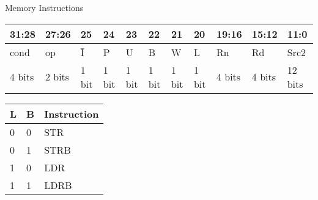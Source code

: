 \documentclass[aspectratio=169]{beamer}
\begin{document}
    \begin{frame}{Memory Instructions}
        \begin{center}
            \renewcommand{\arraystretch}{1.2}
            \begin{tabular}{|p{3.0em}|p{3.0em}|p{1.5em}|p{1.5em}|p{1.5em}|p{1.5em}|p{1.5em}|p{1.5em}|p{3.0em}|p{3.0em}|p{3.0em}|}
            \hline
            31:28 & 27:26 & 25 & 24 & 23 & 22 & 21 & 20 & 19:16 & 15:12 & 11:0\\
            \hline
            cond & op & \=I & P & U & B & W & L & Rn & Rd & Src2\\
            \hline
            4 bits & 2 bits & 1 bit & 1 bit & 1 bit & 1 bit &  1 bit & 1 bit & 4 bits & 4 bits & 12 bits\\
            \hline
            \end{tabular}
            \vspace{0.5cm}
        
            \begin{tabular}{|p{3.0em}|p{3.0em}|p{8.0em}|}
                \hline
                L & B & Instruction \\ \hline
                0 & 0 & STR \\ \hline
                0 & 1 & STRB \\ \hline
                1 & 0 & LDR \\ \hline
                1 & 1 & LDRB \\ \hline
            \end{tabular}
            
        \end{center}
    \end{frame}
\end{document}
